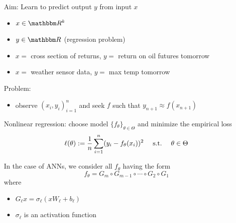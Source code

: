 \begin{frame}
    
    Aim: Learn to predict output $y$ from input $x$
    \begin{itemize}
        \item $x \in \RR^k$
        \vspace{0.5em}
        \item $y \in \RR$  (regression problem)
    \end{itemize}

    \Egs
    \begin{itemize}
        \item $x = $ cross section of returns, $y = $ return on oil futures tomorrow
        \vspace{0.5em}
        \item $x = $ weather sensor data, $y = $ max temp tomorrow
    \end{itemize}
        \vspace{0.5em}
        \vspace{0.5em}

    Problem:

    \begin{itemize}
        \item observe $(x_i, y_i)_{i=1}^n$ and seek $f$ such that $y_{n+1}
            \approx f(x_{n+1})$
    \end{itemize}


\end{frame}



\begin{frame}

    Nonlinear regression: choose model $\{f_\theta\}_{\theta \in \Theta}$ and minimize the empirical loss
    \begin{equation*}
        \ell(\theta) := \frac{1}{n}\sum_{i=1}^n (y_i - f_\theta(x_i))^2
        \quad \ \mathrm{s.t.}\  \quad \theta \in \Theta
    \end{equation*}


    \pause
    \vspace{0.5em}
    In the case of ANNs, we consider all $f_\theta$ having the form
    \begin{equation*}
        f_\theta
        = G_{m} \circ G_{m-1} \circ \cdots \circ G_{2}  \circ G_{1}
    \end{equation*}
    where
    \begin{itemize}
        \item $G_{\ell} x = \sigma_\ell(x W_\ell + b_\ell)$ 
        \vspace{0.5em}
        \item $\sigma_\ell$ is an activation function
    \end{itemize}

\end{frame}




